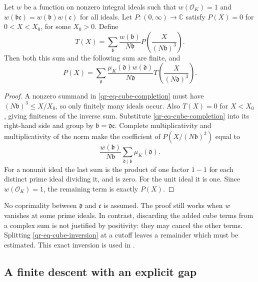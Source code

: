 \begin{lemma}\label{qr-lem-cube-inversion}
Let $w$ be a function on nonzero integral ideals such that
$w(\mathcal O_K)=1$ and $w(\mathfrak b\mathfrak c)
=w(\mathfrak b)w(\mathfrak c)$ for all ideals. Let $P:(0,\infty)
\to\mathbb C$ satisfy $P(X)=0$ for $0<X<X_0$, for some $X_0>0$.
Define
\begin{equation}\label{qr-eq-cube-completion}
 T(X)=\sum_{\mathfrak b}\frac{w(\mathfrak b)}{N\mathfrak b}
            P\left(\frac{X}{(N\mathfrak b)^3}\right).
\end{equation}
Then both this sum and the following sum are finite, and
\begin{equation}\label{qr-eq-cube-inversion}
 P(X)=\sum_{\mathfrak d}
       \frac{\mu_K(\mathfrak d)w(\mathfrak d)}{N\mathfrak d}
       T\left(\frac{X}{(N\mathfrak d)^3}\right).
\end{equation}
\end{lemma}

\begin{proof}
A nonzero summand in \eqref{qr-eq-cube-completion} must have
$(N\mathfrak b)^3\leq X/X_0$, so only finitely many ideals occur.
Also $T(X)=0$ for $X<X_0$, giving finiteness of the inverse sum.
Substitute \eqref{qr-eq-cube-completion} into its right-hand side
and group by $\mathfrak b=\mathfrak d\mathfrak c$. Complete
multiplicativity and multiplicativity of the norm make the coefficient
of $P(X/(N\mathfrak b)^3)$ equal to
\[
 \frac{w(\mathfrak b)}{N\mathfrak b}
       \sum_{\mathfrak d\mid\mathfrak b}\mu_K(\mathfrak d).
\]
For a nonunit ideal the last sum is the product of one factor
$1-1$ for each distinct prime ideal dividing it, and is zero.
For the unit ideal it is one. Since $w(\mathcal O_K)=1$, the
remaining term is exactly $P(X)$.
\end{proof}

No coprimality between $\mathfrak d$ and $\mathfrak c$ is assumed.
The proof still works when $w$ vanishes at some prime ideals.
In contrast, discarding the added cube terms from a complex sum is
not justified by positivity: they may cancel the other terms.
Splitting \eqref{qr-eq-cube-inversion} at a cutoff leaves a
remainder which must be estimated. This exact inversion is used in
\cite[Section~5]{OpenAIOctober}.

\subsection{A finite descent with an explicit gap}

